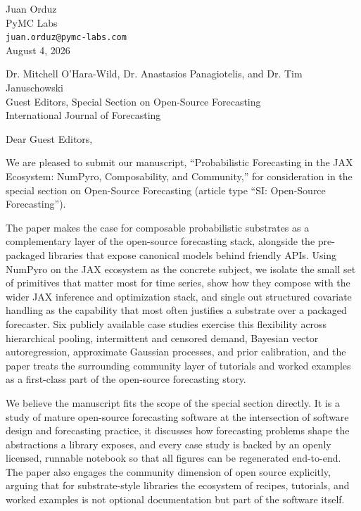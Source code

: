 \documentclass[11pt]{article}
\begin{document}
\begin{flushright}
Juan Orduz\\
PyMC Labs\\
\texttt{juan.orduz@pymc-labs.com}\\[6pt]
August 4, 2026
\end{flushright}

\noindent
Dr. Mitchell O'Hara-Wild, Dr. Anastasios Panagiotelis, and Dr. Tim Januschowski\\
Guest Editors, Special Section on Open-Source Forecasting\\
International Journal of Forecasting

\vspace{1em}

Dear Guest Editors,

We are pleased to submit our manuscript, ``Probabilistic Forecasting in the JAX Ecosystem: NumPyro, Composability, and Community,'' for consideration in the special section on Open-Source Forecasting (article type ``SI: Open-Source Forecasting'').

The paper makes the case for composable probabilistic substrates as a complementary layer of the open-source forecasting stack, alongside the pre-packaged libraries that expose canonical models behind friendly APIs. Using NumPyro on the JAX ecosystem as the concrete subject, we isolate the small set of primitives that matter most for time series, show how they compose with the wider JAX inference and optimization stack, and single out structured covariate handling as the capability that most often justifies a substrate over a packaged forecaster. Six publicly available case studies exercise this flexibility across hierarchical pooling, intermittent and censored demand, Bayesian vector autoregression, approximate Gaussian processes, and prior calibration, and the paper treats the surrounding community layer of tutorials and worked examples as a first-class part of the open-source forecasting story.

We believe the manuscript fits the scope of the special section directly. It is a study of mature open-source forecasting software at the intersection of software design and forecasting practice, it discusses how forecasting problems shape the abstractions a library exposes, and every case study is backed by an openly licensed, runnable notebook so that all figures can be regenerated end-to-end. The paper also engages the community dimension of open source explicitly, arguing that for substrate-style libraries the ecosystem of recipes, tutorials, and worked examples is not optional documentation but part of the software itself.
\end{document}
